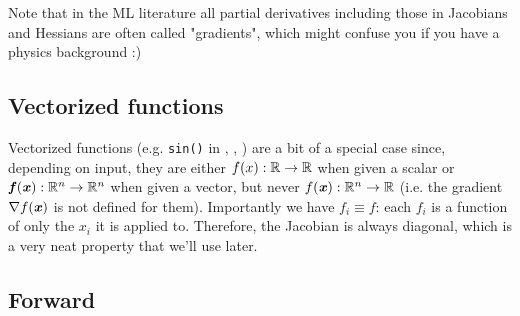 \documentclass[paper=a4,11pt,headsepline]{scrartcl}
\begin{document}
Note that in the ML literature all partial derivatives including those in
Jacobians and Hessians are often called "gradients", which might confuse you if
you have a physics background :)

\subsection{Vectorized functions}

Vectorized functions (e.g. \verb|sin()| in \numpy, \jax, \pytorch) are a
bit of a special case since, depending on input, they are either $f(x):\mathbb
R\rightarrow\mathbb R$ when given a scalar or $\bm{\mathit{f}}(\bm{\mathit{x}}):\mathbb R^n\rightarrow\mathbb R^n$
when given a vector, but never $f(\bm{\mathit{x}}): \mathbb R^n \rightarrow \mathbb R$ (i.e. the
gradient $\nabla f(\bm{\mathit{x}})$ is not defined for them). Importantly we have
$f_i\equiv f$: each $f_i$ is a function of only the $x_i$ it is applied to.
Therefore, the Jacobian is always diagonal, which is a very neat property that
we'll use later.

\subsection{Forward}
\end{document}
